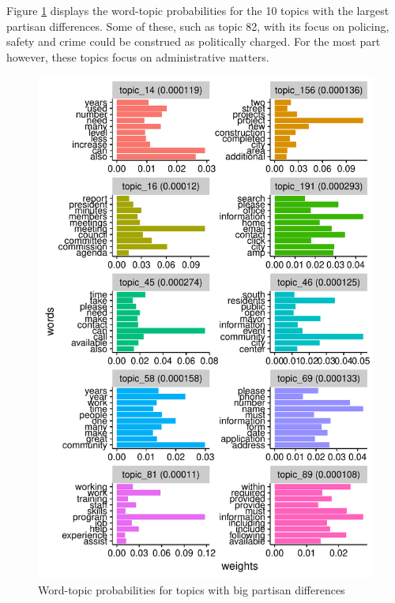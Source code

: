 \documentclass[11pt]{article}
\begin{document}
Figure \ref{plotWTP_bigdiffs} displays the word-topic probabilities for the 10 topics with the largest partisan differences. Some of these, such as topic 82, with its focus on policing, safety and crime could be construed as politically charged. For the most part however, these topics focus on administrative matters.

\begin{figure}[!ht]
	\centering %
	\caption{Word-topic probabilities for topics with big partisan differences}
	\label{plotWTP_bigdiffs}
	\includegraphics[width=\linewidth]{figures/plotWTP_bigdiffs_IN.pdf}
\end{figure}
\end{document}
